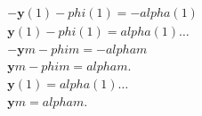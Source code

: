 \begin{align}
  & - \mathbf{y} \left(1\right) - \mathit{phi} \left(1\right) = - \mathit{alpha} \left(1\right) \tag{eq\_0089\_a} \\
  & \mathbf{y} \left(1\right) - \mathit{phi} \left(1\right) = \mathit{alpha} \left(1\right) \hdots \tag{eq\_0089\_b} \\
  & - \mathbf{y} m - \mathit{phi} m = - \mathit{alpha} m \tag{eq\_0089\_c} \\
  & \mathbf{y} m - \mathit{phi} m = \mathit{alpha} m . \tag{eq\_0089\_d} \\
  & \mathbf{y} \left(1\right) = \mathit{alpha} \left(1\right) \hdots \tag{eq\_0090\_a} \\
  & \mathbf{y} m = \mathit{alpha} m . \tag{eq\_0090\_b} \\
\end{align}
